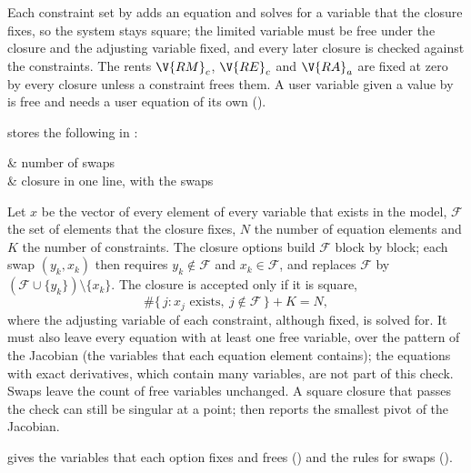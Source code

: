 
Each constraint set by  adds an equation and solves for
a variable that the closure fixes, so the system stays square; the limited
variable must be free under the closure and the adjusting variable fixed, and
every later closure is checked against the constraints. The rents
$\V{RM}_c$, $\V{RE}_c$ and $\V{RA}_a$ are fixed at zero by every closure unless
a constraint frees them. A user variable given a value by 
is free and needs a user equation of its own ().


 stores the following in :
\begin{storedres}
 & number of swaps\\
 & closure in one line, with the swaps\\
\end{storedres}


Let $x$ be the vector of every element of every variable that exists in the
model, $\mathcal{F}$ the set of elements that the closure fixes, $N$ the number
of equation elements and $K$ the number of constraints. The closure options
build $\mathcal{F}$ block by block; each swap $(y_k, x_k)$ then requires
$y_k \notin \mathcal{F}$ and $x_k \in \mathcal{F}$, and replaces $\mathcal{F}$ by
$(\mathcal{F} \cup \{y_k\}) \setminus \{x_k\}$. The closure is accepted only if
it is square,
\begin{equation*}
\#\{\, j : x_j \text{ exists},\ j \notin \mathcal{F} \,\} + K = N,
\end{equation*}
where the adjusting variable of each constraint, although fixed, is solved
for. It must also leave every equation with at least one free variable, over
the pattern of the Jacobian (the variables that each equation element
contains); the equations with exact derivatives, which contain many
variables, are not part of this check. Swaps leave the count of free
variables unchanged. A square closure that passes the check can still be
singular at a point;  then reports the smallest pivot of
the Jacobian.

 gives the variables that each option fixes and
frees () and the rules for swaps
().


\begin{alsosee}
\end{alsosee}
